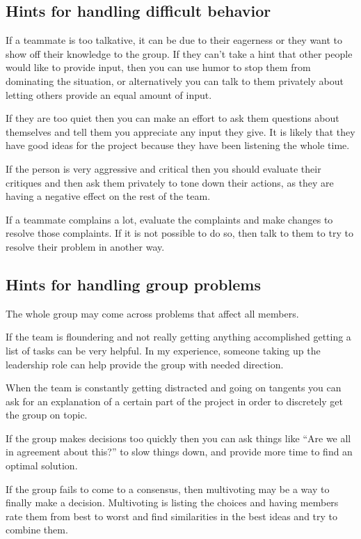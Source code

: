\documentclass[
10pt, %
letterpaper, %
oneside, %
headinclude,footinclude, %
BCOR5mm, %
]{scrartcl}
\begin{document}
\subsection{Hints for handling difficult behavior}

If a teammate is too talkative, it can be due to their eagerness or they
want to show off their knowledge to the group. If they can't take a hint
that other people would like to provide input, then you can use humor to
stop them from dominating the situation, or alternatively you can talk
to them privately about letting others provide an equal amount of input.

If they are too quiet then you can make an effort to ask them questions
about themselves and tell them you appreciate any input they give. It is
likely that they have good ideas for the project because they have been
listening the whole time.

If the person is very aggressive and critical then you should evaluate
their critiques and then ask them privately to tone down their actions,
as they are having a negative effect on the rest of the team.

If a teammate complains a lot, evaluate the complaints and make changes
to resolve those complaints. If it is not possible to do so, then talk
to them to try to resolve their problem in another way.

\subsection{Hints for handling group problems}

The whole group may come across problems that affect all members.

If the team is floundering and not really getting anything accomplished
getting a list of tasks can be very helpful. In my experience, someone
taking up the leadership role can help provide the group with needed
direction.

When the team is constantly getting distracted and going on tangents you
can ask for an explanation of a certain part of the project in order to
discretely get the group on topic.

If the group makes decisions too quickly then you can ask things like
``Are we all in agreement about this?'' to slow things down, and provide
more time to find an optimal solution.

If the group fails to come to a consensus, then multivoting may be a way
to finally make a decision. Multivoting is listing the choices and
having members rate them from best to worst and find similarities in the
best ideas and try to combine them.
\end{document}
